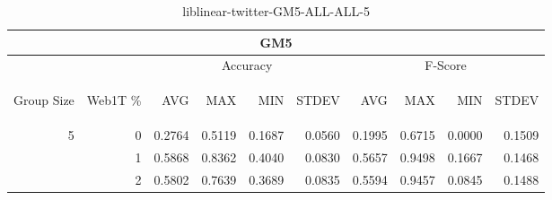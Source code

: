 \begin{center}
\begin{table}[htbp]
\begin{tabular}{ | r | r | r | r | r | r | r | r | r | r |}
\hline
\multicolumn{10}{|c|}{GM5}\\
\hline
 & & \multicolumn{4}{|c|}{Accuracy} & \multicolumn{4}{|c|}{F-Score}\\ \cline{3-10}
\begin{sideways}Group Size\end{sideways} & \begin{sideways}Web1T \%\end{sideways} & \begin{sideways}AVG\end{sideways} & \begin{sideways}MAX\end{sideways} & \begin{sideways}MIN\end{sideways} & \begin{sideways}STDEV\end{sideways} & \begin{sideways}AVG\end{sideways} & \begin{sideways}MAX\end{sideways} & \begin{sideways}MIN\end{sideways} & \begin{sideways}STDEV\end{sideways}\\
\hline
\multirow{2}{*}{5}
 & 0 & 0.2764 & 0.5119 & 0.1687 & 0.0560 & 0.1995 & 0.6715 & 0.0000 & 0.1509\\ \cline{2-10}
 & 1 & 0.5868 & 0.8362 & 0.4040 & 0.0830 & 0.5657 & 0.9498 & 0.1667 & 0.1468\\ \cline{2-10}
 & 2 & 0.5802 & 0.7639 & 0.3689 & 0.0835 & 0.5594 & 0.9457 & 0.0845 & 0.1488\\ \cline{2-10}
\hline
\end{tabular}
\caption{liblinear-twitter-GM5-ALL-ALL-5}
\label{table:liblinear-twitter-GM5-ALL-ALL-5}
\end{table}
\end{center}

